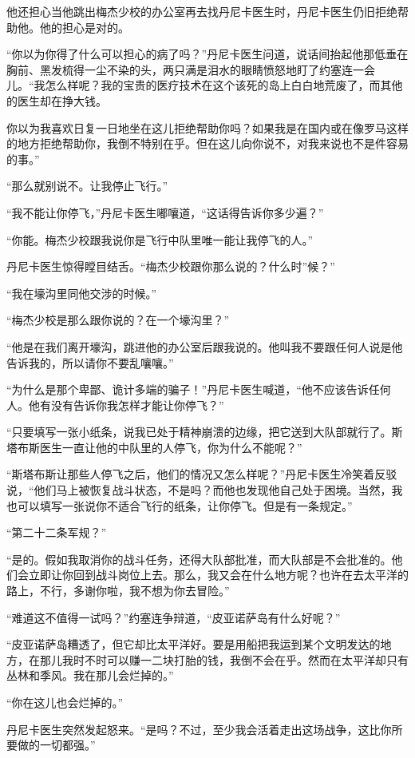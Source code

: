     他还担心当他跳出梅杰少校的办公室再去找丹尼卡医生时，丹尼卡医生仍旧拒绝帮助他。他的担心是对的。

    “你以为你得了什么可以担心的病了吗？”丹尼卡医生问道，说话间抬起他那低垂在胸前、黑发梳得一尘不染的头，两只满是泪水的眼睛愤怒地盯了约塞连一会儿。“我怎么样呢？我的宝贵的医疗技术在这个该死的岛上白白地荒废了，而其他的医生却在挣大钱。

    你以为我喜欢日复一日地坐在这儿拒绝帮助你吗？如果我是在国内或在像罗马这样的地方拒绝帮助你，我倒不特别在乎。但在这儿向你说不，对我来说也不是件容易的事。”

    “那么就别说不。让我停止飞行。”

    “我不能让你停飞，”丹尼卡医生嘟嚷道，“这话得告诉你多少遍？”

    “你能。梅杰少校跟我说你是飞行中队里唯一能让我停飞的人。”

    丹尼卡医生惊得瞠目结舌。“梅杰少校跟你那么说的？什么时”候？”

    “我在壕沟里同他交涉的时候。”

    “梅杰少校是那么跟你说的？在一个壕沟里？”

    “他是在我们离开壕沟，跳进他的办公室后跟我说的。他叫我不要跟任何人说是他告诉我的，所以请你不要乱嚷嚷。”

    “为什么是那个卑鄙、诡计多端的骗子！”丹尼卡医生喊道，“他不应该告诉任何人。他有没有告诉你我怎样才能让你停飞？”

    “只要填写一张小纸条，说我已处于精神崩溃的边缘，把它送到大队部就行了。斯塔布斯医生一直让他的中队里的人停飞，你为什么不能呢？”

    “斯塔布斯让那些人停飞之后，他们的情况又怎么样呢？”丹尼卡医生冷笑着反驳说，“他们马上被恢复战斗状态，不是吗？而他也发现他自己处于困境。当然，我也可以填写一张说你不适合飞行的纸条，让你停飞。但是有一条规定。”

    “第二十二条军规？”

    “是的。假如我取消你的战斗任务，还得大队部批准，而大队部是不会批准的。他们会立即让你回到战斗岗位上去。那么，我又会在什么地方呢？也许在去太平洋的路上，不行，多谢你啦，我不想为你去冒险。”

    “难道这不值得一试吗？”约塞连争辩道，“皮亚诺萨岛有什么好呢？”

    “皮亚诺萨岛糟透了，但它却比太平洋好。要是用船把我运到某个文明发达的地方，在那儿我时不时可以赚一二块打胎的钱，我倒不会在乎。然而在太平洋却只有丛林和季风。我在那儿会烂掉的。”

    “你在这儿也会烂掉的。”

    丹尼卡医生突然发起怒来。“是吗？不过，至少我会活着走出这场战争，这比你所要做的一切都强。”

